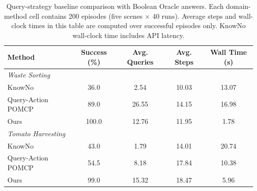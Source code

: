 \begin{table}[t]
\centering
\caption{Query-strategy baseline comparison with Boolean Oracle answers. Each domain-method cell contains 200 episodes (five scenes $\times$ 40 runs). Average steps and wall-clock times in this table are computed over successful episodes only. KnowNo wall-clock time includes API latency.}
\label{tab:query_baselines}
\footnotesize
\begin{tabular}{lcccc}
\toprule
\textbf{Method} & \textbf{Success (\%)} & \textbf{Avg. Queries} & \textbf{Avg. Steps} & \textbf{Wall Time (s)} \\
\midrule
\multicolumn{5}{l}{\textit{Waste Sorting}} \\
KnowNo & 36.0 & 2.54 & 10.03 & 13.07 \\
Query-Action POMCP & 89.0 & 26.55 & 14.15 & 16.98 \\
Ours & 100.0 & 12.76 & 11.95 & 1.78 \\
\midrule
\multicolumn{5}{l}{\textit{Tomato Harvesting}} \\
KnowNo & 43.0 & 1.79 & 14.01 & 20.74 \\
Query-Action POMCP & 54.5 & 8.18 & 17.84 & 10.38 \\
Ours & 99.0 & 15.32 & 18.47 & 5.96 \\
\bottomrule
\end{tabular}
\end{table}
